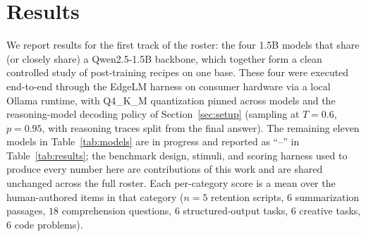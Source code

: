 \documentclass[runningheads]{llncs}
\begin{document}
\section{Results}
\label{sec:results}

We report results for the first track of the roster: the four 1.5B models that
share (or closely share) a Qwen2.5-1.5B backbone, which together form a clean
controlled study of post-training recipes on one base. These four were executed
end-to-end through the EdgeLM harness on consumer hardware via a local Ollama
runtime, with Q4\_K\_M quantization pinned across models and the reasoning-model
decoding policy of Section~\ref{sec:setup} (sampling at $T{=}0.6$, $p{=}0.95$,
with reasoning traces split from the final answer). The remaining eleven models
in Table~\ref{tab:models} are in progress and reported as ``--'' in
Table~\ref{tab:results}; the benchmark design, stimuli, and scoring harness used
to produce every number here are contributions of this work and are shared
unchanged across the full roster. Each per-category score is a mean over the
human-authored items in that category ($n{=}5$ retention scripts, $6$
summarization passages, $18$ comprehension questions, $6$ structured-output
tasks, $6$ creative tasks, $6$ code problems).
\end{document}
